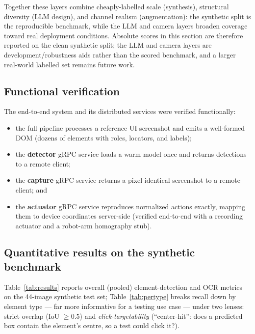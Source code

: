 \documentclass[11pt,a4paper]{article}
\begin{document}
Together these layers combine cheaply-labelled scale (synthesis), structural
diversity (LLM design), and channel realism (augmentation): the synthetic split is
the reproducible benchmark, while the LLM and camera layers broaden coverage toward
real deployment conditions. Absolute scores in this section are therefore reported on
the clean synthetic split; the LLM and camera layers are development/robustness aids
rather than the scored benchmark, and a larger real-world labelled set remains future
work.

\subsection{Functional verification}
The end-to-end system and its distributed services were verified functionally:
\begin{itemize}[leftmargin=1.4em]
  \item the full pipeline processes a reference UI screenshot and emits a
        well-formed DOM (dozens of elements with roles, locators, and labels);
  \item the \textbf{detector} gRPC service loads a warm model once and returns
        detections to a remote client;
  \item the \textbf{capture} gRPC service returns a pixel-identical screenshot to a
        remote client; and
  \item the \textbf{actuator} gRPC service reproduces normalized actions exactly,
        mapping them to device coordinates server-side (verified end-to-end with a
        recording actuator and a robot-arm homography stub).
\end{itemize}

\subsection{Quantitative results on the synthetic benchmark}
Table~\ref{tab:results} reports overall (pooled) element-detection and OCR metrics
on the 44-image synthetic test set; Table~\ref{tab:pertype} breaks recall down by
element type --- far more informative for a testing use case --- under two lenses:
strict overlap (IoU $\geq 0.5$) and \emph{click-targetability} (``center-hit'': does
a predicted box contain the element's centre, so a test could click it?).
\end{document}
